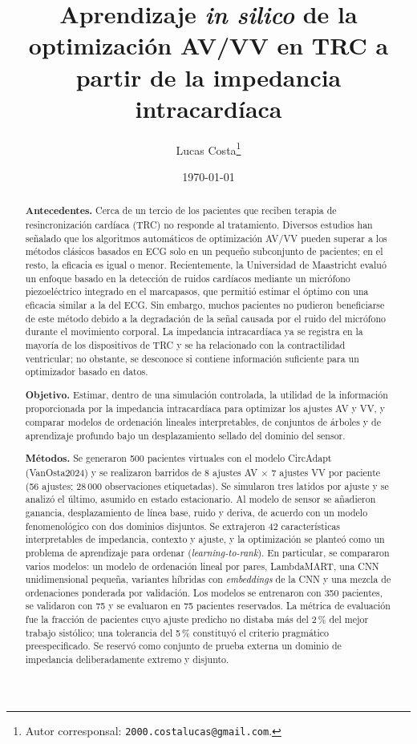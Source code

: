 \documentclass[11pt,a4paper]{article}
\title{\textbf{Aprendizaje \emph{in silico} de la optimización AV/VV en TRC a partir de la impedancia intracardíaca}}
\author[1]{Lucas Costa\thanks{Autor corresponsal:
\texttt{2000.costalucas@gmail.com}.}}
\date{\today}
\begin{document}
\maketitle

\begin{abstract}
\noindent
\textbf{Antecedentes.} Cerca de un tercio de los pacientes que reciben terapia de
resincronización cardíaca (TRC) no responde al tratamiento. Diversos estudios han
señalado que los algoritmos automáticos de optimización AV/VV pueden superar a
los métodos clásicos basados en ECG solo en un pequeño subconjunto de pacientes;
en el resto, la eficacia es igual o menor. Recientemente, la Universidad de
Maastricht evaluó un enfoque basado en la detección de ruidos cardíacos mediante
un micrófono piezoeléctrico integrado en el marcapasos, que permitió estimar el
óptimo con una eficacia similar a la del ECG. Sin embargo, muchos pacientes no
pudieron beneficiarse de este método debido a la degradación de la señal causada
por el ruido del micrófono durante el movimiento corporal.
La impedancia intracardíaca ya se registra en la mayoría de los dispositivos de
TRC y se ha relacionado con la contractilidad ventricular; no obstante, se
desconoce si contiene información suficiente para un optimizador basado en datos.

\textbf{Objetivo.} Estimar, dentro de una simulación controlada, la utilidad de
la información proporcionada por la impedancia intracardíaca para optimizar los
ajustes AV y VV, y comparar modelos de ordenación lineales interpretables, de
conjuntos de árboles y de aprendizaje profundo bajo un desplazamiento sellado del
dominio del sensor.

\textbf{Métodos.} Se generaron 500 pacientes virtuales con el modelo CircAdapt
(VanOsta2024) y se realizaron barridos de 8 ajustes AV $\times$ 7 ajustes VV por
paciente (56 ajustes; 28\,000 observaciones etiquetadas). Se simularon tres
latidos por ajuste y se analizó el último, asumido en estado estacionario. Al
modelo de sensor se añadieron ganancia, desplazamiento de línea base, ruido y
deriva, de acuerdo con un modelo fenomenológico con dos dominios disjuntos. Se
extrajeron 42 características interpretables de impedancia, contexto y ajuste, y
la optimización se planteó como un problema de aprendizaje para ordenar
(\emph{learning-to-rank}). En particular, se compararon varios modelos: un modelo
de ordenación lineal por pares, LambdaMART, una CNN unidimensional pequeña,
variantes híbridas con \emph{embeddings} de la CNN y una mezcla de ordenaciones
ponderada por validación. Los modelos se entrenaron con 350 pacientes, se
validaron con 75 y se evaluaron en 75 pacientes reservados. La métrica de
evaluación fue la fracción de pacientes cuyo ajuste predicho no distaba más del
2\,\% del mejor trabajo sistólico; una tolerancia del 5\,\% constituyó el
criterio pragmático preespecificado. Se reservó como conjunto de prueba externa
un dominio de impedancia deliberadamente extremo y disjunto.


\end{abstract}
\end{document}

